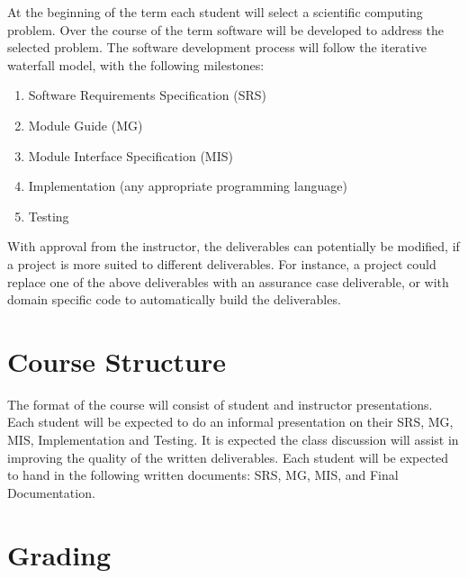 \documentclass[12pt]{article}
\begin{document}
At the beginning of the term each student will select a scientific computing
problem.  Over the course of the term software will be developed to address the
selected problem.  The software development process will follow the iterative
waterfall model, with the following milestones:

\begin {enumerate}

\item Software Requirements Specification (SRS)
\item Module Guide (MG)
\item Module Interface Specification (MIS)
\item Implementation (any appropriate programming language)
\item Testing

\end {enumerate}

With approval from the instructor, the deliverables can potentially be modified,
if a project is more suited to different deliverables.  For instance, a project
could replace one of the above deliverables with an assurance case deliverable,
or with domain specific code to automatically build the deliverables.

\section {Course Structure}

The format of the course will consist of student and instructor presentations.
Each student will be expected to do an informal presentation on their SRS, MG,
MIS, Implementation and Testing.  It is expected the class discussion will
assist in improving the quality of the written deliverables.  Each student will
be expected to hand in the following written documents: SRS, MG, MIS, and Final
Documentation.

\section {Grading}
\end{document}
